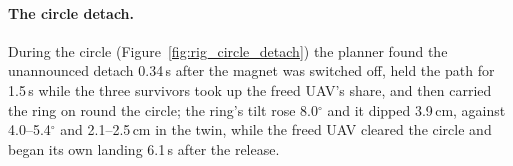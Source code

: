 \paragraph{The circle detach.} During the circle (Figure~\ref{fig:rig_circle_detach}) the planner found the
unannounced detach 0.34\,s after the magnet was switched off, held the path for 1.5\,s while the three survivors
took up the freed UAV's share, and then carried the ring on round the circle; the ring's tilt rose 8.0$^\circ$ and it
dipped 3.9\,cm, against 4.0--5.4$^\circ$ and 2.1--2.5\,cm in the twin, while the freed UAV cleared the circle and
began its own landing 6.1\,s after the release.


